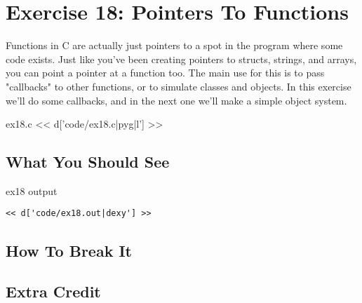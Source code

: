 \chapter{Exercise 18: Pointers To Functions}

Functions in C are actually just pointers to a spot in the
program where some code exists.  Just like you've been creating
pointers to structs, strings, and arrays, you can point a
pointer at a function too.  The main use for this is to pass
"callbacks" to other functions, or to simulate classes and
objects.  In this exercise we'll do some callbacks, and in
the next one we'll make a simple object system.

\begin{code}{ex18.c}
<< d['code/ex18.c|pyg|l'] >>
\end{code}

\section{What You Should See}

\begin{code}{ex18 output}
\begin{lstlisting}
<< d['code/ex18.out|dexy'] >>
\end{lstlisting}
\end{code}


\section{How To Break It}


\section{Extra Credit}



